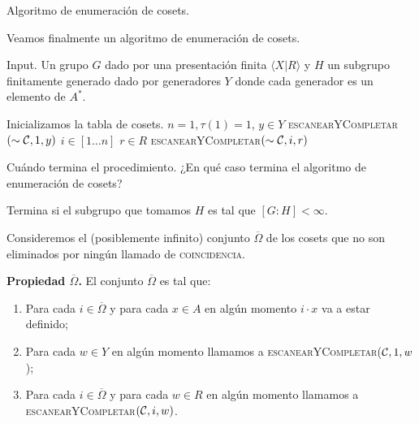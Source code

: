 \documentclass[aspectratio=169, 9pt]{beamer}
\newcommand{\fg}{finitamente generado }
\newcommand{\coin}{\textsc{coincidencia}}
\newcommand{\scanfill}{\textsc{escanearYCompletar}}
\newcommand{\In}{[1 \dots n]}
\newcommand{\ol}{\overline}
\newcommand{\Co}{{\cal{C}}}
\begin{document}
\begin{frame}[fragile]{Algoritmo de enumeración de cosets.}

Veamos finalmente un algoritmo de enumeración de cosets.


\begin{alertblock}{Input.}
	Un grupo $G$ dado por una presentación finita $\langle X | R \rangle$ y $H$ un subgrupo \fg dado por generadores $Y$ donde cada generador es un elemento de $A^*$.
\end{alertblock}

\begin{codebox}
	\li  \Comment Inicializamos la tabla de cosets.
	\li $n=1, \tau(1)=1$,
	\li \For  $y \in Y$ 
		\Do \li \scanfill$(\sim \Co, 1, y)$  
	\End
	\li \For $i \in \In$
	 \Do \li \For $r \in R$
	 \Do \li \For \scanfill$(\sim \Co, i, r)$
	 \End
	  \End
	\End
\end{codebox}


\end{frame}





\begin{frame}[fragile]{Cuándo termina el procedimiento.}
	¿En qué caso termina el algoritmo de enumeración de cosets?
	
	Termina si el subgrupo que tomamos $H$ es tal que $[G:H] < \infty$.
	

	Consideremos el (posiblemente infinito) conjunto $\ol \Omega$ de los cosets que no son eliminados por ningún llamado de \coin.

	
	
	\textbf{Propiedad $\ol \Omega$.} El conjunto $\ol \Omega$ es tal que:
	\begin{enumerate}
		\item Para cada $i \in \overline \Omega$ y para cada $x \in A$ en algún momento $i \cdot x$ va a estar definido;
		\item Para cada $w \in Y$ en algún momento llamamos a \scanfill($\Co,{1},w$);
		\item Para cada $i \in \ol \Omega$ y para cada $w \in R$ en algún momento llamamos a \scanfill$(\Co,i, w)$.
	\end{enumerate}
\end{frame}
\end{document}
